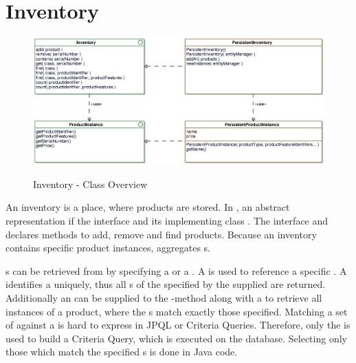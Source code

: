 \section{Inventory}
\label{sec:inventory}

\begin{figure}[ht]
	\centering
  \includegraphics[width=1.0\textwidth]{images/Inventory_Overview.eps}
	\label{inventory_overview}
	\caption{Inventory - Class Overview}
\end{figure}

An inventory is a place, where products are stored.
In \salespoint{}, an abstract representation if the  interface and its implementing class .
The interface and declares methods to add, remove and find products.
Because an inventory contains specific product instances,  aggregates s.

s can be retrieved from  by specifying a  or a .
A  is used to reference a specific .
A  identifies a  uniquely, thus all s of the  specified by the supplied  are returned.
Additionally an  can be supplied to the -method along with a  to retrieve all instances of a product, where the s match exactly those specified.
Matching a set of  against a  is hard to express in JPQL or Criteria Queries.
Therefore, only the  is used to build a Criteria Query, which is executed on the database.
Selecting only those  which match the specified s is done in Java code.

